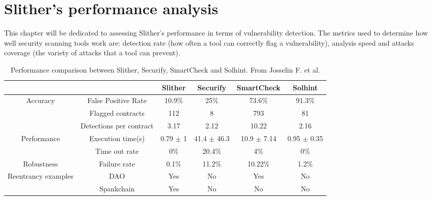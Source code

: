 \chapter{Slither's performance analysis}
This chapter will be dedicated to assessing Slither's performance in terms of vulnerability detection. The metrics used to determine how well security scanning tools work are: detection rate (how often a tool can correctly flag a vulnerability), analysis speed and attacks coverage (the variety of attacks that a tool can prevent).

\begin{table}[h]
\small
\begin{tabular}{cc|cccc|}
\cline{3-6}
                                                           &                         & \multicolumn{1}{c|}{Slither} & \multicolumn{1}{c|}{Securify} & \multicolumn{1}{c|}{SmartCheck} & Solhint       \\ \hline
\multicolumn{1}{|c|}{\multirow{3}{*}{Accuracy}}            & False Positive Rate     & 10.9\%                       & 25\%                          & 73.6\%                          & 91.3\%        \\
\multicolumn{1}{|c|}{}                                     & Flagged contracts       & 112                          & 8                             & 793                             & 81            \\
\multicolumn{1}{|c|}{}                                     & Detections per contract & 3.17                         & 2.12                          & 10.22                           & 2.16          \\ \hline
\multicolumn{1}{|c|}{\multirow{2}{*}{Performance}}         & Execution time(s)  & 0.79 $\pm$ 1                   & 41.4 $\pm$ 46.3  & 10.9 $\pm$ 7.14                   & 0.95 $\pm$ 0.35 \\
\multicolumn{1}{|c|}{}                                     & Time out rate           & 0\%                          & 20.4\%                        & 4\%                             & 0\%           \\ \hline
\multicolumn{1}{|c|}{Robustness}                           & Failure rate            & 0.1\%                        & 11.2\%                        & 10.22\%                         & 1.2\%         \\ \hline
\multicolumn{1}{|c|}{\multirow{2}{*}{Reentrancy examples}} & DAO                     & Yes                          & No                            & Yes                             & No            \\
\multicolumn{1}{|c|}{}                                     & Spankchain              & Yes                          & No                            & No                              & No            \\ \hline
\end{tabular}
\caption{Performance comparison between Slither, Securify, SmartCheck and Solhint. From Josselin F. et al. \cite{slither}}
\label{tab:my-table}
\end{table}

